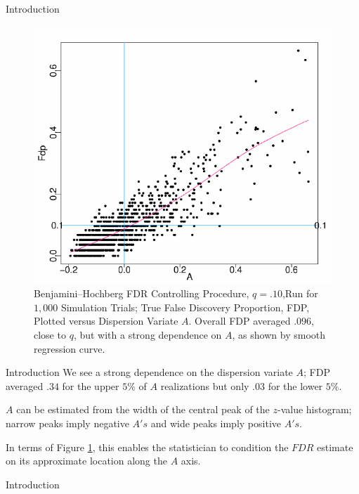 \documentclass{beamer}
\begin{document}
\begin{frame}[t]{Introduction}\vspace{10pt}
\begin{figure}[h]
	\centering
	\includegraphics[scale=0.35]{efron2007figure2}
	\caption{ \footnotesize{Benjamini–Hochberg FDR Controlling Procedure, $q = .10$,Run for $1,000$ Simulation Trials; True False Discovery Proportion, FDP, Plotted versus Dispersion Variate $A$. Overall FDP averaged $.096$, close to $q$, but with a strong dependence on $A$, as shown by smooth regression curve.}}
	\label{fig2}
\end{figure}
\end{frame}

\begin{frame}[t]{Introduction}\vspace{10pt}
We see a strong dependence on the dispersion variate $A$; FDP averaged $.34$ for the upper $5\%$ of $A$ realizations but only $.03$ for the lower $5\%$.

$A$ can be estimated from the width of the central peak of the $z$-value histogram; narrow peaks imply negative $A's$ and wide peaks imply positive $A's$.

In terms of Figure \ref{fig2}, this enables the statistician to condition the $FDR$ estimate on its approximate location along the $A$ axis.
\end{frame}

\begin{frame}[t]{Introduction}\vspace{10pt}

\end{frame}
\end{document}
